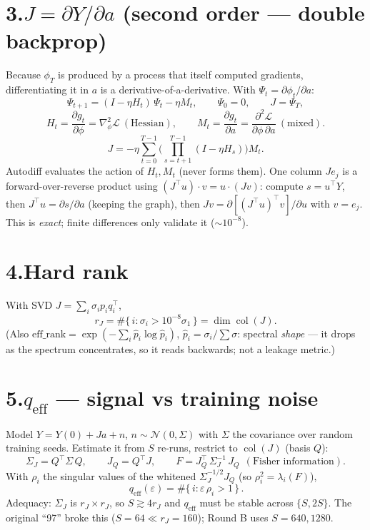 \documentclass[11pt]{article}
\begin{document}
\section*{3.\quad $J=\partial Y/\partial a$ (second order --- double backprop)}
Because $\phi_T$ is produced by a process that itself computed gradients, differentiating it in $a$ is a
derivative-of-a-derivative. With $\Psi_t=\partial\phi_t/\partial a$:
\begin{equation}
\Psi_{t+1}=(I-\eta H_t)\,\Psi_t-\eta M_t,\qquad \Psi_0=0,\qquad J=\Psi_T,
\end{equation}
\[
H_t=\frac{\partial g_t}{\partial\phi}=\nabla_\phi^2\mathcal L\ (\text{Hessian}),\qquad
M_t=\frac{\partial g_t}{\partial a}=\frac{\partial^2\mathcal L}{\partial\phi\,\partial a}\ (\text{mixed}).
\]
\[
J=-\eta\sum_{t=0}^{T-1}\Big(\prod_{s=t+1}^{T-1}(I-\eta H_s)\Big)M_t .
\]
Autodiff evaluates the action of $H_t,M_t$ (never forms them). One column $Je_j$ is a
forward-over-reverse product using $(J^\top u)\!\cdot\! v=u\!\cdot\!(Jv)$: compute $s=u^\top Y$, then
$J^\top u=\partial s/\partial a$ (keeping the graph), then $Jv=\partial[(J^\top u)^\top v]/\partial u$ with
$v=e_j$. This is \emph{exact}; finite differences only validate it ($\sim 10^{-8}$).

\section*{4.\quad Hard rank}
With SVD $J=\sum_i\sigma_i p_i q_i^\top$,
\[
r_J=\#\{\,i:\sigma_i>10^{-8}\sigma_1\,\}=\dim\operatorname{col}(J).
\]
(Also $\mathrm{eff\_rank}=\exp(-\sum_i\hat p_i\log\hat p_i)$, $\hat p_i=\sigma_i/\sum\sigma$: spectral
\emph{shape} --- it drops as the spectrum concentrates, so it reads backwards; not a leakage metric.)

\section*{5.\quad $q_{\mathrm{eff}}$ --- signal vs training noise}
Model $Y=Y(0)+Ja+n$, $n\sim\mathcal N(0,\Sigma)$ with $\Sigma$ the covariance over random training
seeds. Estimate it from $S$ re-runs, restrict to $\operatorname{col}(J)$ (basis $Q$):
\[
\Sigma_J=Q^\top\Sigma\,Q,\qquad J_Q=Q^\top J,\qquad F=J_Q^\top\,\Sigma_J^{-1}\,J_Q\ \ (\text{Fisher information}).
\]
With $\rho_i$ the singular values of the whitened $\Sigma_J^{-1/2}J_Q$ (so $\rho_i^2=\lambda_i(F)$),
\[
\boxed{\,q_{\mathrm{eff}}(\varepsilon)=\#\{\,i:\varepsilon\,\rho_i>1\,\}\,}.
\]
Adequacy: $\Sigma_J$ is $r_J{\times}r_J$, so $S\gtrsim 4r_J$ and $q_{\mathrm{eff}}$ must be stable across
$\{S,2S\}$. The original ``97'' broke this ($S{=}64\ll r_J{=}160$); Round B uses $S=640,1280$.
\end{document}
